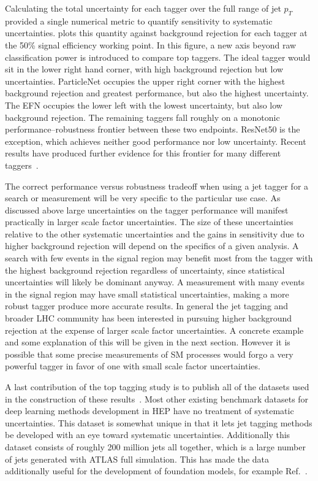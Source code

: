 Calculating the total uncertainty for each tagger over the full range of jet $p_T$ provided a single numerical metric to quantify sensitivity to systematic uncertainties.
 plots this quantity against background rejection for each tagger at the 50\% signal efficiency working point.
In this figure, a new axis beyond raw classification power is introduced to compare top taggers.
The ideal tagger would sit in the lower right hand corner, with high background rejection but low uncertainties.
ParticleNet occupies the upper right corner with the highest background rejection and greatest performance, but also the highest uncertainty.
The EFN occupies the lower left with the lowest uncertainty, but also low background rejection.
The remaining taggers fall roughly on a monotonic performance--robustness frontier between these two endpoints.
ResNet50 is the exception, which achieves neither good performance nor low uncertainty.
Recent results have produced further evidence for this frontier for many different taggers~\cite{Gambhir:2025xim}.

The correct performance versus robustness tradeoff when using a jet tagger for a search or measurement will be very specific to the particular use case.
As discussed above large uncertainties on the tagger performance will manifest practically in larger scale factor uncertainties.
The size of these uncertainties relative to the other systematic uncertainties and the gains in sensitivity due to higher background rejection will depend on the specifics of a given analysis.
A search with few events in the signal region may benefit most from the tagger with the highest background rejection regardless of uncertainty, since statistical uncertainties will likely be dominant anyway.
A measurement with many events in the signal region may have small statistical uncertainties, making a more robust tagger produce more accurate results.
In general the jet tagging and broader LHC community has been interested in pursuing higher background rejection at the expense of larger scale factor uncertainties.
A concrete example and some explanation of this will be given in the next section.
However it is possible that some precise measurements of SM processes would forgo a very powerful tagger in favor of one with small scale factor uncertainties.

A last contribution of the top tagging study is to publish all of the datasets used in the construction of these results~\cite{top_tagging_data}.
Most other existing benchmark datasets for deep learning methods development in HEP have no treatment of systematic uncertainties.
This dataset is somewhat unique in that it lets jet tagging methods be developed with an eye toward systematic uncertainties.
Additionally this dataset consists of roughly 200 million jets all together, which is a large number of jets generated with ATLAS full simulation.
This has made the data additionally useful for the development of foundation models, for example Ref.~\cite{Bhimji:2025isp}.

